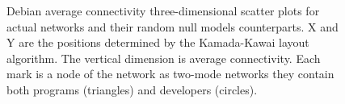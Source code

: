 \begin{figure}[p]
\hspace{.01in}

\caption[Debian average connectivity three-dimensional scatter plots.]{Debian average connectivity three-dimensional scatter plots for actual networks and their random null models counterparts. X and Y are the positions determined by the Kamada-Kawai layout algorithm. The vertical dimension is average connectivity. Each mark is a node of the network as two-mode networks they contain both programs (triangles) and developers (circles).}
\label{fig:debian-s3d}
\end{figure}
